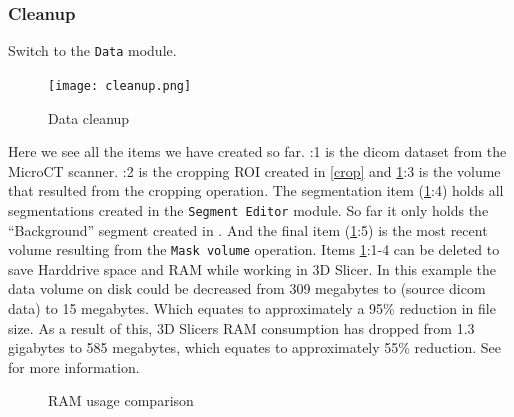 \subsubsection{Cleanup}
Switch to the \texttt{Data} module.
\begin{figure}[h!]
	\centerline{
		\texttt{[image: cleanup.png]}}
	\caption{Data cleanup}\label{fig:clr}
\end{figure}
\noindent
Here we see all the items we have created so far.
:1 is the dicom dataset from the MicroCT scanner.
:2 is the cropping ROI created in \cref{crop} and \cref{fig:clr}:3 is the volume that resulted from the cropping operation.
The segmentation item (\cref{fig:clr}:4) holds all segmentations created in the \texttt{Segment Editor} module. So far it only holds the ``Background'' segment created in . And the final item (\cref{fig:clr}:5) is the most recent volume resulting from the \texttt{Mask volume} operation.
Items \cref{fig:clr}:1-4 can be deleted to save Harddrive space and RAM while working in 3D Slicer.
\noindent
In this example the data volume on disk could be decreased from 309 megabytes to (source dicom data) to 15 megabytes.
Which equates to approximately a 95\% reduction in file size.
As a result of this, 3D Slicers RAM consumption has dropped from 1.3 gigabytes to 585 megabytes, which equates to approximately 55\% reduction.
See  for more information.
\begin{figure}
	\caption{RAM usage comparison}\label{fig:ramUC}
\end{figure}
\pagebreak


